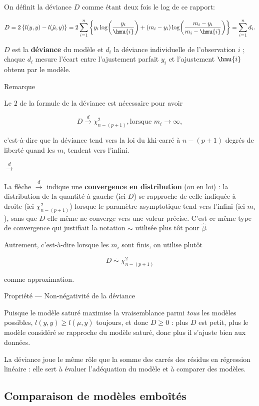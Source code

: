 \documentclass[
  french,
  letterpaper,
  DIV=11,
  numbers=noendperiod]{scrreprt}
\begin{document}
On définit la déviance \(D\) comme étant deux fois le log de ce rapport:

\[D =2\left\{l(y,y) - l(\hat\mu,y)\right\} = 2\sum_{i=1}^n\left\{y_i\log\!\left(\frac{y_i}{\hmu{i}}\right) + (m_i - y_i)\log\!\left(\frac{m_i - y_i}{m_i - \hmu{i}}\right)\right\} = \sum_{i=1}^n d_i.\]

\(D\) est la \textbf{déviance} du modèle et \(d_i\) la déviance
individuelle de l'observation \(i\) ; chaque \(d_i\) mesure l'écart
entre l'ajustement parfait \(y_i\) et l'ajustement \(\hmu{i}\) obtenu
par le modèle.

{Remarque}

Le \(2\) de la formule de la déviance est nécessaire pour avoir

\[D \xrightarrow{d} \chi_{n-(p+1)}^2, \text{lorsque } m_i\to \infty,\]

c'est-à-dire que la déviance tend vers la loi du khi-carré à \(n-(p+1)\)
degrés de liberté quand les \(m_i\) tendent vers l'infini.

\(\xrightarrow{d}\)

La flèche \(\xrightarrow{d}\) indique une \textbf{convergence en
distribution} (ou en loi) : la distribution de la quantité à gauche (ici
\(D\)) se rapproche de celle indiquée à droite (ici
\(\chi^2_{n-(p+1)}\)) lorsque le paramètre asymptotique tend vers
l'infini (ici \(m_i\)), sans que \(D\) elle-même ne converge vers une
valeur précise. C'est ce même type de convergence qui justifiait la
notation \(\dot\sim\) utilisée plus tôt pour \(\hat\beta\).

Autrement, c'est-à-dire lorsque les \(m_i\) sont finis, on utilise
plutôt

\[D \;\overset{\cdot}{\sim}\; \chi_{n-(p+1)}^2\]

comme approximation.

{Propriété --- Non-négativité de la déviance}

Puisque le modèle saturé maximise la vraisemblance parmi \emph{tous} les
modèles possibles, \(l(y,y) \geq l(\hat\mu,y)\) toujours, et donc
\(D \geq 0\) : plus \(D\) est petit, plus le modèle considéré se
rapproche du modèle saturé, donc plus il s'ajuste bien aux données.

La déviance joue le même rôle que la somme des carrés des résidus en
régression linéaire : elle sert à évaluer l'adéquation du modèle et à
comparer des modèles.

\subsection{Comparaison de modèles
emboîtés}\label{comparaison-de-moduxe8les-embouxeetuxe9s}
\end{document}
